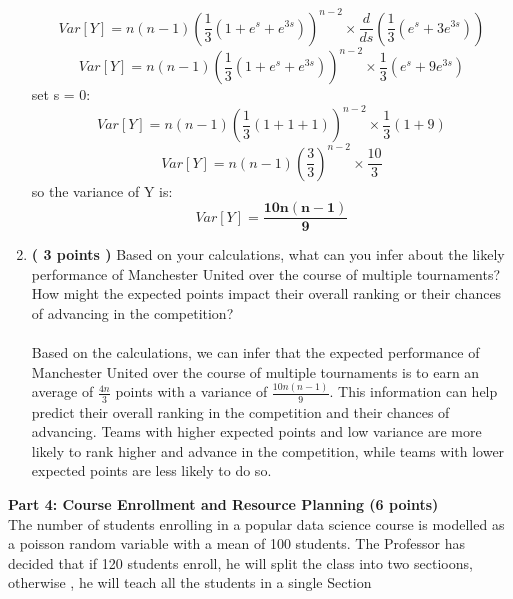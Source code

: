 \documentclass[a3paper,12pt]{extarticle} %
\begin{document}
\begin{enumerate}
\[        Var[Y] = n(n-1)\left(\frac{1}{3}(1 + e^{s} + e^{3s})\right)^{n-2} \times \frac{d}{ds}\left(\frac{1}{3}(e^{s} + 3e^{3s})\right)
        \]
        \[
        Var[Y] = n(n-1)\left(\frac{1}{3}(1 + e^{s} + e^{3s})\right)^{n-2} \times \frac{1}{3}(e^{s} + 9e^{3s})
        \]
        set s = 0:
        \[
        Var[Y] = n(n-1)\left(\frac{1}{3}(1 + 1 + 1)\right)^{n-2} \times \frac{1}{3}(1 + 9)
        \]
        \[
        Var[Y] = n(n-1)\left(\frac{3}{3}\right)^{n-2} \times \frac{10}{3}
        \]
        so the variance of Y is:
        \[
        Var[Y] = \mathbf{\frac{10n(n-1)}{9}}
        \]
        \item \textbf{( 3 points )} Based on your calculations, what can you infer about the likely performance of Manchester United over the course of multiple tournaments? How might the expected points impact their overall ranking or their chances of advancing in the competition?
        \\\\ Based on the calculations, we can infer that the expected performance of Manchester United over the course of multiple tournaments is to earn an average of \(\frac{4n}{3}\) points with a variance of \(\frac{10n(n-1)}{9}\). This information can help predict their overall ranking in the competition and their chances of advancing. Teams with higher expected points and low variance are more likely to rank higher and advance in the competition, while teams with lower expected points are less likely to do so.
    \end{enumerate}
    \subitem \textbf{Part 4: Course Enrollment and Resource Planning (6 points)}
    \\ The number of students enrolling in a popular data science course is modelled as a poisson random variable with a mean of 100 students. The Professor has decided that if 120 students enroll, he will split the class into two sectioons, otherwise , he will teach all the students in a single Section
\end{document}
